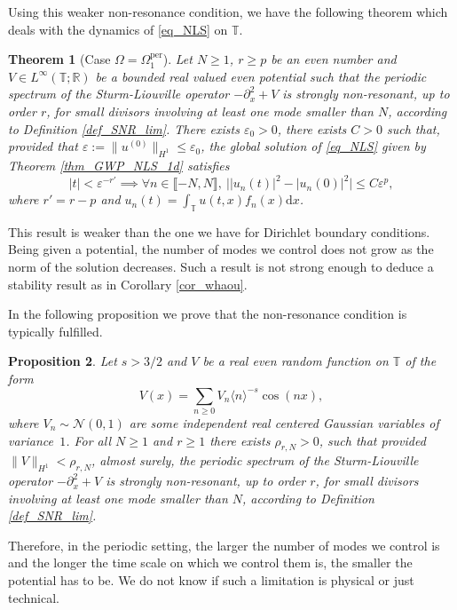 \documentclass[JEP,XML,SOM,Unicode,NoEqCountersInSection,published]{cedram}
\let\epsilon\varepsilon
\newtheorem{theorem}{Theorem}[section]
\newtheorem{proposition}[theorem]{Proposition}
\theoremstyle{definition}
\begin{document}
Using this weaker non-resonance condition, we have the following theorem which deals with the dynamics of \eqref{eq_NLS} on $\mathbb{T}$.
\begin{theorem}[Case $\Omega = \Omega^{\mathrm{per}}_1$]
\label{thm_per_1d}
Let $N\geq 1$, $r\geq p$ be an even number and $V \in L^\infty(\mathbb{T}; \mathbb{R})$ be a bounded real valued even potential such that the periodic spectrum of the Sturm-Liouville operator $-\partial_x^2 +V$ is strongly non-resonant, up to order $r$, for small divisors involving at least one mode smaller than $N$, according to Definition \ref{def_SNR_lim}. There exists $\epsilon_0>0$, there exists $C>0$ such that, provided that $\varepsilon:= \| u^{(0)} \|_{H^1} \leq \epsilon_{0}$,
the global solution of \eqref{eq_NLS} given by Theorem \ref{thm_GWP_NLS_1d} satisfies
\[
|t|< \varepsilon^{-r'} \implies \forall n \in \llbracket-N,N \rrbracket, \ \big| |u_n(t)|^2 - |u_n(0)|^2 \big| \leq C \varepsilon^p,
\]
where $r'=r-p$ and $u_n(t) = \int_\mathbb{T} u(t,x) f_n(x) \mathrm{d}x$.
\end{theorem}
This result is weaker than the one we have for Dirichlet boundary conditions. Being given a potential, the number of modes we control does not grow as the norm of the solution decreases. Such a result is not strong enough to deduce a stability result as in Corollary \ref{cor_whaou}.

In the following proposition we prove that the non-resonance condition is typically fulfilled.

\begin{proposition}
\label{prop_proba_per_1d}
Let $s>3/2$ and $V$ be a real even random function on $\mathbb{T}$ of the form
\[
V(x) = \sum_{n \geq 0 } V_n \langle n \rangle^{-s} \cos(n x),
\]
where $V_n \sim \mathcal{N}(0,1)$ are some independent real centered Gaussian variables of variance~$1$. For all $N\!\geq\!1$ and $r\!\geq\!1$ there exists $\rho_{r,N}\!>\!0$, such that provided $\|V\|_{H^1}\!<\!\rho_{r,N}$, almost surely, the periodic spectrum of the Sturm-Liouville operator $-\partial_x^2 +V$ is strongly non-resonant, up to order $r$, for small divisors involving at least one mode smaller than $N$, according to Definition \ref{def_SNR_lim}.
\end{proposition}
Therefore, in the periodic setting, the larger the number of modes we control is and the longer the time scale on which we control them is, the smaller the potential has to be. We do not know if such a limitation is physical or just technical.
\end{document}
